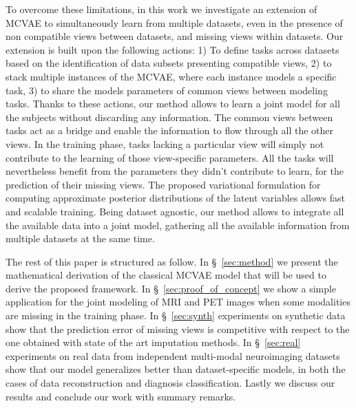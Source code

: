 To overcome these limitations, in this work we investigate an extension of MCVAE to simultaneously learn from multiple datasets, even in the presence of non compatible views between datasets, and missing views within datasets.
Our extension  is built upon the following actions:
1) To define tasks across datasets based on the identification of data subsets presenting compatible views,
2) to stack multiple instances of the MCVAE, where each instance models a specific task,
3) to share the models parameters of common views between modeling tasks.
%
Thanks to these actions, our method allows to learn a joint model for all the subjects without discarding any information.
The common views between tasks act as a bridge and enable the information to flow through all the other views.
In the training phase, tasks lacking a particular view will simply not contribute to the learning of those view-specific parameters.
All the tasks will nevertheless benefit from the parameters they didn't contribute to learn, for the prediction of their missing views.
The proposed variational formulation for computing approximate posterior distributions of the latent variables allows fast and scalable training.
Being dataset agnostic, our method allows to integrate all the available data into a joint model, gathering  all the available information from multiple datasets at the same time.

The rest of this paper is structured as follow.
In \S~\ref{sec:method} we present the mathematical derivation of the classical MCVAE model that will be used to derive the proposed framework.
In \S~\ref{sec:proof_of_concept} we show a simple application for the joint modeling of MRI and PET images when some modalities are missing in the training phase.
In \S~\ref{sec:synth} experiments on synthetic data show that the prediction error of missing views is competitive with respect to the one obtained with state of the art imputation methods.
In \S~\ref{sec:real} experiments on real data from independent multi-modal neuroimaging datasets show that our model generalizes better than dataset-specific models, in both the cases of data reconstruction and diagnosis classification.
Lastly we discuss our results and conclude our work with summary remarks.

